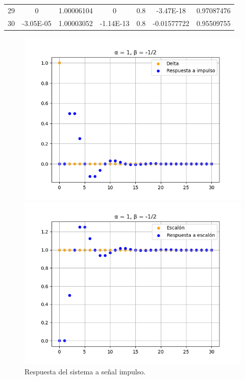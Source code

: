 \begin{table}[H]
\begin{tabular}{c|cccccc|}
    \multicolumn{1}{|c|}{29} & 0                                          & 1.00006104                           & 0                                               & 0.8                                      & -3.47E-18                                                  & 0.97087476                      \\ \cline{1-1}
    \multicolumn{1}{|c|}{30} & -3.05E-05                                  & 1.00003052                           & -1.14E-13                                       & 0.8                                      & -0.01577722                                                & 0.95509755                      \\ \hline
    \end{tabular}
    \end{table}


\begin{figure}[H]
    \centering
    \begin{minipage}[b]{0.49\textwidth}
    \includegraphics[width=\textwidth]{images/ej9_fig1_delta.png}
    \caption{Respuesta del sistema a señal impulso.}
    \end{minipage}
    \hfill
    \begin{minipage}[b]{0.49\textwidth}
    \includegraphics[width=\textwidth]{images/ej9_fig1_step.png}

\end{minipage}
\end{figure}
